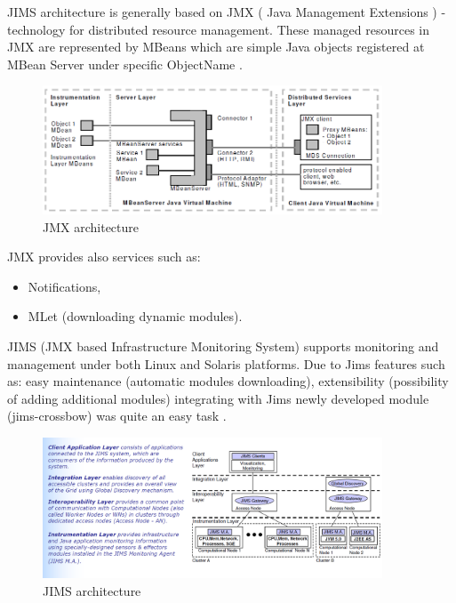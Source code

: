 \documentclass[11pt]{book}
\begin{document}
      JIMS architecture is generally based on JMX ( Java Management Extensions ) - technology for distributed resource
      management. These managed resources in JMX are represented by MBeans which are simple Java objects registered at
      MBean Server under specific ObjectName \cite{jims}.
    
      \begin{figure}[H]
        \begin{center}
          \includegraphics[width=0.9\textwidth]{img/jims/jmx.png}
        \end{center}
        \caption{JMX architecture \cite{jims}}
      \end{figure}
	
      JMX provides also services such as:

      \begin{itemize}
        \item Notifications,
        \item MLet (downloading dynamic modules).
      \end{itemize}
	
      JIMS (JMX based Infrastructure Monitoring System) supports monitoring and management under both Linux and Solaris
      platforms.  Due to Jims features such as: easy maintenance (automatic modules downloading), extensibility
      (possibility of adding additional modules) integrating with Jims newly	developed module (jims-crossbow) was quite
      an easy task \cite{jims}.
    
      \begin{figure}[H]
        \begin{center}
          \includegraphics[width=0.9\textwidth]{img/jims/jims.png}
        \end{center}
        \caption{JIMS architecture \cite{jims}}
      \end{figure}
	 
\end{document}
